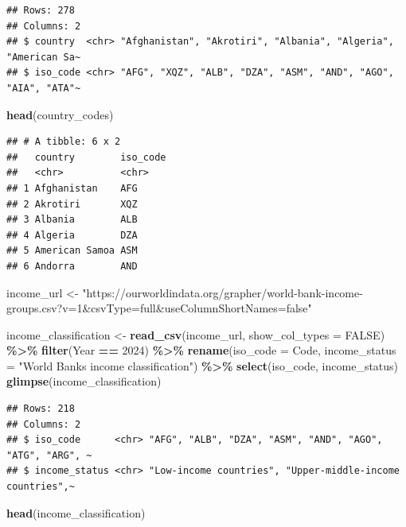 \documentclass[
]{article}
\newenvironment{Shaded}{\begin{snugshade}}{\end{snugshade}}
\newcommand{\AttributeTok}[1]{\textcolor[rgb]{0.13,0.29,0.53}{#1}}
\newcommand{\ConstantTok}[1]{\textcolor[rgb]{0.56,0.35,0.01}{#1}}
\newcommand{\DecValTok}[1]{\textcolor[rgb]{0.00,0.00,0.81}{#1}}
\newcommand{\FunctionTok}[1]{\textcolor[rgb]{0.13,0.29,0.53}{\textbf{#1}}}
\newcommand{\NormalTok}[1]{#1}
\newcommand{\OtherTok}[1]{\textcolor[rgb]{0.56,0.35,0.01}{#1}}
\newcommand{\SpecialCharTok}[1]{\textcolor[rgb]{0.81,0.36,0.00}{\textbf{#1}}}
\newcommand{\StringTok}[1]{\textcolor[rgb]{0.31,0.60,0.02}{#1}}
\begin{document}
\begin{verbatim}
## Rows: 278
## Columns: 2
## $ country  <chr> "Afghanistan", "Akrotiri", "Albania", "Algeria", "American Sa~
## $ iso_code <chr> "AFG", "XQZ", "ALB", "DZA", "ASM", "AND", "AGO", "AIA", "ATA"~
\end{verbatim}

\begin{Shaded}
\begin{Highlighting}[]
\FunctionTok{head}\NormalTok{(country\_codes)}
\end{Highlighting}
\end{Shaded}

\begin{verbatim}
## # A tibble: 6 x 2
##   country        iso_code
##   <chr>          <chr>   
## 1 Afghanistan    AFG     
## 2 Akrotiri       XQZ     
## 3 Albania        ALB     
## 4 Algeria        DZA     
## 5 American Samoa ASM     
## 6 Andorra        AND
\end{verbatim}

\begin{Shaded}
\begin{Highlighting}[]
\NormalTok{income\_url }\OtherTok{\textless{}{-}} \StringTok{"https://ourworldindata.org/grapher/world{-}bank{-}income{-}groups.csv?v=1\&csvType=full\&useColumnShortNames=false"}

\NormalTok{income\_classification }\OtherTok{\textless{}{-}} \FunctionTok{read\_csv}\NormalTok{(income\_url, }\AttributeTok{show\_col\_types =} \ConstantTok{FALSE}\NormalTok{) }\SpecialCharTok{\%\textgreater{}\%}
  \FunctionTok{filter}\NormalTok{(Year }\SpecialCharTok{==} \DecValTok{2024}\NormalTok{) }\SpecialCharTok{\%\textgreater{}\%}
  \FunctionTok{rename}\NormalTok{(}\AttributeTok{iso\_code =}\NormalTok{ Code, }
         \AttributeTok{income\_status =} \StringTok{"World Bank\textquotesingle{}s income classification"}\NormalTok{) }\SpecialCharTok{\%\textgreater{}\%}
  \FunctionTok{select}\NormalTok{(iso\_code, income\_status)}
\FunctionTok{glimpse}\NormalTok{(income\_classification)}
\end{Highlighting}
\end{Shaded}

\begin{verbatim}
## Rows: 218
## Columns: 2
## $ iso_code      <chr> "AFG", "ALB", "DZA", "ASM", "AND", "AGO", "ATG", "ARG", ~
## $ income_status <chr> "Low-income countries", "Upper-middle-income countries",~
\end{verbatim}

\begin{Shaded}
\begin{Highlighting}[]
\FunctionTok{head}\NormalTok{(income\_classification)}
\end{Highlighting}
\end{Shaded}
\end{document}
